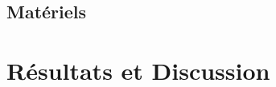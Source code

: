 \documentclass{ifri}
\begin{document}
   \section{Matériels}
     

 \chapter{Résultats et Discussion}\label{chap:3}
   
	
 

 
\lhead[]{} \rhead[]{} \chead[]{}






\end{document}
